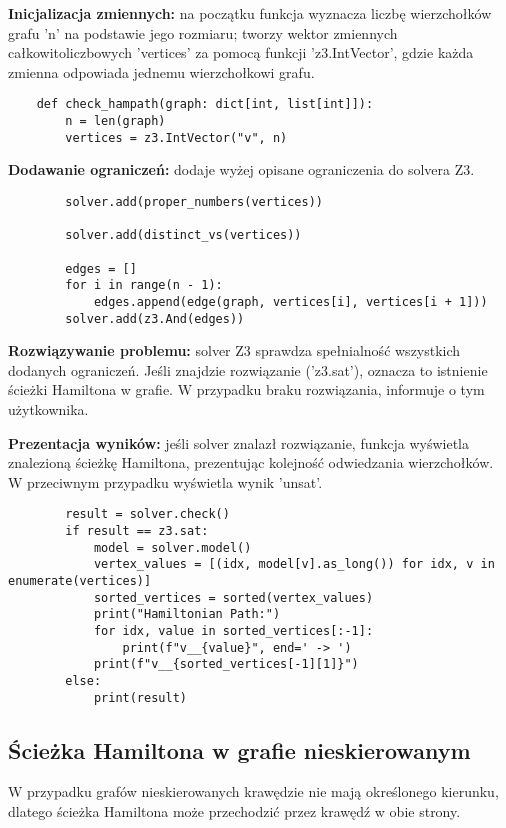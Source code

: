 \textbf{Inicjalizacja zmiennych: } na początku funkcja wyznacza liczbę wierzchołków grafu 'n' na podstawie jego rozmiaru; tworzy wektor zmiennych całkowitoliczbowych 'vertices' za pomocą funkcji 'z3.IntVector', gdzie każda zmienna odpowiada jednemu wierzchołkowi grafu.

\begin{lstlisting}	
	def check_hampath(graph: dict[int, list[int]]):
		n = len(graph)
		vertices = z3.IntVector("v", n)
\end{lstlisting}
	
\textbf{Dodawanie ograniczeń: } dodaje wyżej opisane ograniczenia do solvera Z3.

\begin{lstlisting}
		solver.add(proper_numbers(vertices))
	
		solver.add(distinct_vs(vertices))
	
		edges = []
		for i in range(n - 1):
			edges.append(edge(graph, vertices[i], vertices[i + 1]))
		solver.add(z3.And(edges))
\end{lstlisting}

\textbf{Rozwiązywanie problemu: } solver Z3 sprawdza spełnialność wszystkich dodanych ograniczeń. Jeśli znajdzie rozwiązanie ('z3.sat'), oznacza to istnienie ścieżki Hamiltona w grafie. W przypadku braku rozwiązania, informuje o tym użytkownika.

\textbf{Prezentacja wyników: } jeśli solver znalazł rozwiązanie, funkcja wyświetla znalezioną ścieżkę Hamiltona, prezentując kolejność odwiedzania wierzchołków. W przeciwnym przypadku wyświetla wynik 'unsat'.

\begin{lstlisting}
		result = solver.check()
		if result == z3.sat:
			model = solver.model()
			vertex_values = [(idx, model[v].as_long()) for idx, v in enumerate(vertices)]
			sorted_vertices = sorted(vertex_values)
			print("Hamiltonian Path:")
			for idx, value in sorted_vertices[:-1]:
				print(f"v__{value}", end=' -> ')
			print(f"v__{sorted_vertices[-1][1]}")
		else:
			print(result)
\end{lstlisting}


\subsection{Ścieżka Hamiltona w grafie nieskierowanym}

W przypadku grafów nieskierowanych krawędzie nie mają określonego kierunku, dlatego ścieżka Hamiltona może przechodzić przez krawędź w obie strony. 

